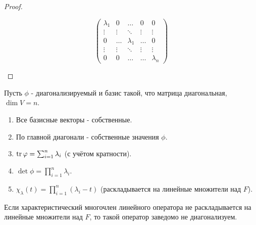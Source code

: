 \begin{proof}
\begin{enumerate}
\begin{equation*}
        \left(
            \begin{array}{ccccc}
            \lambda_{1} & 0 & \ldots & 0 & 0\\
            \vdots & \vdots & \ddots & \vdots & \vdots\\
            0 & \ldots & \lambda_{1} & \ldots & 0\\
            \vdots & \vdots & \ddots & \vdots & \vdots\\
            0 & 0 & \ldots & \ldots & \lambda_n
            \end{array}
        \right)
        \end{equation*}
    \end{enumerate}
\end{proof}

\begin{note}
    Пусть $\phi$ - диагонализируемый и базис такой, что матрица диагональная, $\dim V = n$.
    \begin{enumerate}
        \item Все базисные векторы - собственные.
        \item По главной диагонали - собственные значения $\phi$.
        \item $\operatorname{tr} \varphi = \sum_{i=1}^n \lambda_i$ (с учётом кратности).
        \item $\det \phi = \prod_{i=1}^n \lambda_i$.
        \item $\chi _{\lambda} (t) = \prod_{i=1}^n (\lambda_i - t)$ 
        (раскладывается на линейные множители над $F$).
    \end{enumerate}
\end{note}

\begin{corollary}
    Если характеристический многочлен линейного оператора не раскладывается на линейные множители 
    над $F$, то такой оператор заведомо не диагонализуем.
\end{corollary}

